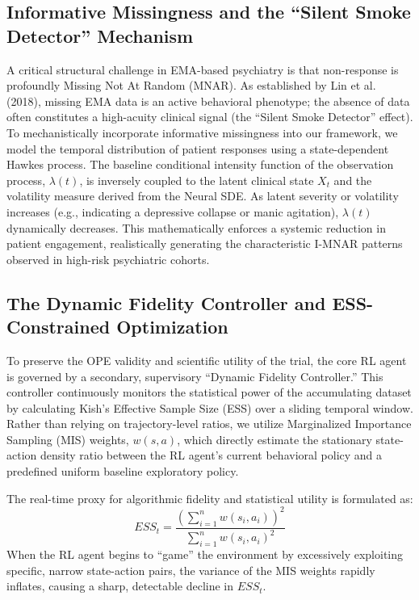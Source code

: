 \subsection{Informative Missingness and the ``Silent Smoke Detector'' Mechanism}
A critical structural challenge in EMA-based psychiatry is that non-response is profoundly Missing Not At Random (MNAR). As established by Lin et al. (2018), missing EMA data is an active behavioral phenotype; the absence of data often constitutes a high-acuity clinical signal (the ``Silent Smoke Detector'' effect). To mechanistically incorporate informative missingness into our framework, we model the temporal distribution of patient responses using a state-dependent Hawkes process. The baseline conditional intensity function of the observation process, $\lambda(t)$, is inversely coupled to the latent clinical state $X_t$ and the volatility measure derived from the Neural SDE. As latent severity or volatility increases (e.g., indicating a depressive collapse or manic agitation), $\lambda(t)$ dynamically decreases. This mathematically enforces a systemic reduction in patient engagement, realistically generating the characteristic I-MNAR patterns observed in high-risk psychiatric cohorts.

\subsection{The Dynamic Fidelity Controller and ESS-Constrained Optimization}
To preserve the OPE validity and scientific utility of the trial, the core RL agent is governed by a secondary, supervisory ``Dynamic Fidelity Controller.'' This controller continuously monitors the statistical power of the accumulating dataset by calculating Kish's Effective Sample Size (ESS) over a sliding temporal window. Rather than relying on trajectory-level ratios, we utilize Marginalized Importance Sampling (MIS) weights, $w(s, a)$, which directly estimate the stationary state-action density ratio between the RL agent's current behavioral policy and a predefined uniform baseline exploratory policy.

The real-time proxy for algorithmic fidelity and statistical utility is formulated as:
$$ESS_t = \frac{\left(\sum_{i=1}^n w(s_i, a_i)\right)^2}{\sum_{i=1}^n w(s_i, a_i)^2}$$
When the RL agent begins to ``game'' the environment by excessively exploiting specific, narrow state-action pairs, the variance of the MIS weights rapidly inflates, causing a sharp, detectable decline in $ESS_t$.

